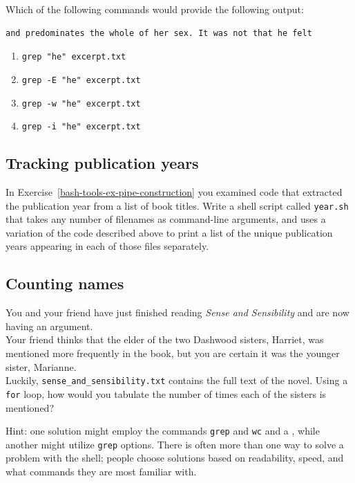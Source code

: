 \documentclass[
]{krantz}
\providecommand{\tightlist}{%
  \setlength{\itemsep}{0pt}\setlength{\parskip}{0pt}}
\begin{document}
Which of the following commands would provide the following output:

\begin{verbatim}
and predominates the whole of her sex. It was not that he felt
\end{verbatim}

\begin{enumerate}
\def\labelenumi{\arabic{enumi}.}
\tightlist
\item
  \texttt{grep\ "he"\ excerpt.txt}
\item
  \texttt{grep\ -E\ "he"\ excerpt.txt}
\item
  \texttt{grep\ -w\ "he"\ excerpt.txt}
\item
  \texttt{grep\ -i\ "he"\ excerpt.txt}
\end{enumerate}

\hypertarget{bash-advanced-ex-year-script}{%
\subsection{Tracking publication years}\label{bash-advanced-ex-year-script}}

In Exercise~\ref{bash-tools-ex-pipe-construction}
you examined code that extracted the publication year from a list of book titles.
Write a shell script called \texttt{year.sh} that takes any number of
filenames as command-line arguments,
and uses a variation of the code described above to print a list
of the unique publication years appearing in each of those files separately.

\hypertarget{bash-advanced-ex-sense-sensibility}{%
\subsection{Counting names}\label{bash-advanced-ex-sense-sensibility}}

You and your friend have just finished reading \emph{Sense and Sensibility}
and are now having an argument.\\
Your friend thinks that the elder of the two Dashwood sisters,
Harriet,
was mentioned more frequently in the book,
but you are certain it was the younger sister, Marianne.\\
Luckily, \texttt{sense\_and\_sensibility.txt} contains the full text of the novel.
Using a \texttt{for} loop,
how would you tabulate the number of times each of the sisters is mentioned?

Hint: one solution might employ
the commands \texttt{grep} and \texttt{wc} and a \texttt{\textbar{}},
while another might utilize \texttt{grep} options.
There is often more than one way to solve a problem with the shell;
people choose solutions based on readability,
speed,
and what commands they are most familiar with.
\end{document}
